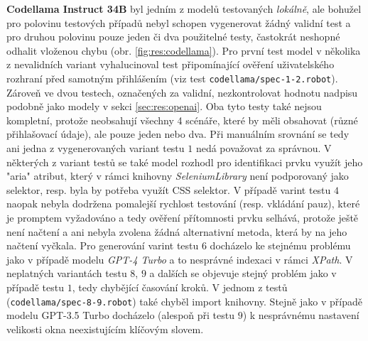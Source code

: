 \documentclass[czech, ma, kiv, he, iso690numb, pdf, viewonly]{fasthesis}
\begin{document}
            \textbf{Codellama Instruct 34B} byl jedním z modelů testovaných \textit{lokálně}, ale bohužel pro polovinu testových případů nebyl schopen vygenerovat žádný validní test a pro druhou polovinu pouze jeden či dva použitelné testy, častokrát neshopné odhalit vloženou chybu (obr. \ref{fig:res:codellama}). Pro první test model v několika z nevalidních variant vyhalucinoval test připomínající ověření uživatelského rozhraní před samotným přihlášením (viz test \verb|codellama/spec-1-2.robot|). Zároveň ve dvou testech, označených za validní, nezkontrolovat hodnotu nadpisu podobně jako modely v sekci \ref{sec:res:openai}. Oba tyto testy také nejsou kompletní, protože neobsahují všechny 4 scénáře, které by měli obsahovat (různé přihlašovací údaje), ale pouze jeden nebo dva. Při manuálním srovnání se tedy ani jedna z vygenerovaných variant testu \(1\) nedá považovat za správnou. V některých z variant testů se také model rozhodl pro identifikaci prvku využít jeho "aria" atribut, který v rámci knihovny \textit{SeleniumLibrary} není podporovaný jako selektor, resp. byla by potřeba využít CSS selektor. V případě varint testu \(4\) naopak nebyla dodržena pomalejší rychlost testování (resp. vkládání pauz), které je promptem vyžadováno a tedy ověření přítomnosti prvku selhává, protože ještě není načtení a ani nebyla zvolena žádná alternativní metoda, která by na jeho načtení vyčkala. Pro generování varint testu \(6\) docházelo ke stejnému problému jako v případě modelu \textit{GPT-4 Turbo} a to nesprávné indexaci v rámci \textit{XPath}. V neplatných variantách testu \(8\), \(9\) a dalších se objevuje stejný problém jako v případě testu \(1\), tedy chybějící časování kroků. V jednom z testů (\verb|codellama/spec-8-9.robot|) také chyběl import knihovny. Stejně jako v případě modelu GPT-3.5 Turbo docházelo (alespoň při testu \(9\)) k nesprávnému nastavení velikosti okna neexistujícím klíčovým slovem.
\end{document}
